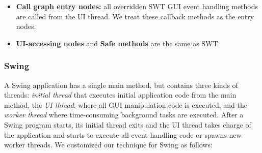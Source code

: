 \begin{itemize}

\item \textbf{Call graph entry nodes: } all overridden SWT
GUI event handling methods are called from the UI thread.
We treat these callback methods as the entry nodes.



\item \textbf{UI-accessing nodes} and \textbf{Safe methods} are the same as SWT.

\end{itemize}

\subsubsection{Swing}



A Swing application has a single main method, but contains three kinds of
threads: \textit{initial thread} that executes initial application code from the main method,
the \textit{UI thread}, where all GUI manipulation code is executed,
and the \textit{worker thread} where time-consuming background tasks are executed.
After a Swing program starts, its initial thread exits and the UI thread takes charge
of the application and starts to execute all event-handling code or spawns new worker threads. 
We customized our technique for Swing as follows:

